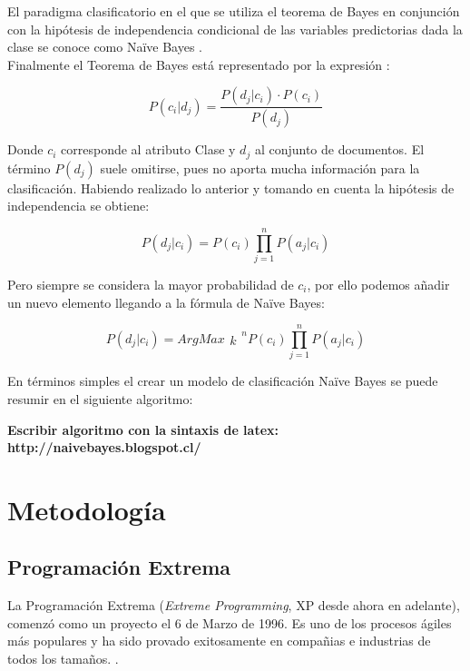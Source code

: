 	El paradigma clasificatorio en el que se utiliza el teorema de Bayes en conjunción con la hipótesis de independencia condicional de las variables predictorias dada la clase se conoce como Naïve Bayes \cite{NaiveBayes3}.\\

	Finalmente el Teorema de Bayes está representado por la expresión \cite{NaiveBayes4}:

	\[
		P(c_{i}|d_{j}) = \frac{P(d_{j}|c_{i}) · P(c_{i})}{P(d_{j})}
	\]

	Donde \begin{math} c_{i} \end{math} corresponde al atributo Clase y \begin{math} d_{j} \end{math} al conjunto de documentos. El término \begin{math} P(d_{j}) \end{math} suele omitirse, pues no aporta mucha información para la clasificación. Habiendo realizado lo anterior y tomando en cuenta la hipótesis de independencia se obtiene:

	\[
		P(d_{j}|c_{i}) = P(c_{i})\prod_{j=1}^n P(a_{j}|c_{i})
	\]

	Pero siempre se considera la mayor probabilidad de \begin{math} c_{i} \end{math}, por ello podemos añadir un nuevo elemento llegando a la fórmula de Naïve Bayes:

	\[
		P(d_{j}|c_{i}) = ArgMax{\substack{k}^n P(c_{i})}\prod_{j=1}^n P(a_{j}|c_{i})
	\]

	En términos simples el crear un modelo de clasificación Naïve Bayes se puede resumir en el siguiente algoritmo:

	\textbf{Escribir algoritmo con la sintaxis de latex: http://naivebayes.blogspot.cl/}

\section{Metodología}
\label{sec:MetodologiaDetalle}

\subsection{Programación Extrema}
\label{subsec:XP}
La Programación Extrema (\textit{Extreme Programming}, XP desde ahora en adelante), comenzó como un proyecto el 6 de Marzo de 1996. Es uno de los procesos ágiles más populares y ha sido provado exitosamente en compañias e industrias de todos los tamaños. \cite{xP}.\\

